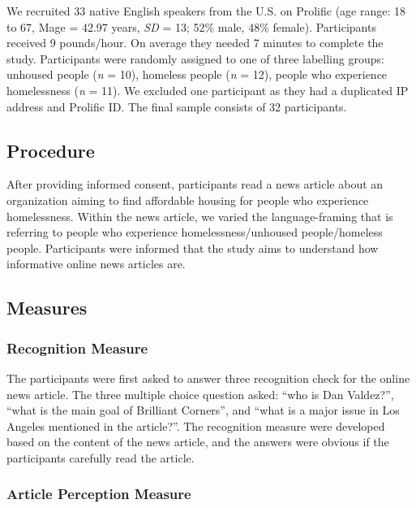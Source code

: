 \documentclass[
  man]{apa6}
\begin{document}
We recruited 33 native English speakers from the U.S. on Prolific (age range: 18 to 67, Mage = 42.97 years, \emph{SD} = 13; 52\% male, 48\% female). Participants received 9 pounds/hour. On average they needed 7 minutes to complete the study. Participants were randomly assigned to one of three labelling groups: unhoused people (\emph{n} = 10), homeless people (\emph{n} = 12), people who experience homelessness (\emph{n} = 11). We excluded one participant as they had a duplicated IP address and Prolific ID. The final sample consists of 32 participants.

\hypertarget{procedure}{%
\subsection{Procedure}\label{procedure}}

After providing informed consent, participants read a news article about an organization aiming to find affordable housing for people who experience homelessness. Within the news article, we varied the language-framing that is referring to people who experience homelessness/unhoused people/homeless people. Participants were informed that the study aims to understand how informative online news articles are.

\hypertarget{measures}{%
\subsection{Measures}\label{measures}}

\hypertarget{recognition-measure}{%
\subsubsection{Recognition Measure}\label{recognition-measure}}

The participants were first asked to answer three recognition check for the online news article. The three multiple choice question asked: ``who is Dan Valdez?'', ``what is the main goal of Brilliant Corners'', and ``what is a major issue in Los Angeles mentioned in the article?''. The recognition measure were developed based on the content of the news article, and the answers were obvious if the participants carefully read the article.

\hypertarget{article-perception-measure}{%
\subsubsection{Article Perception Measure}\label{article-perception-measure}}
\end{document}
